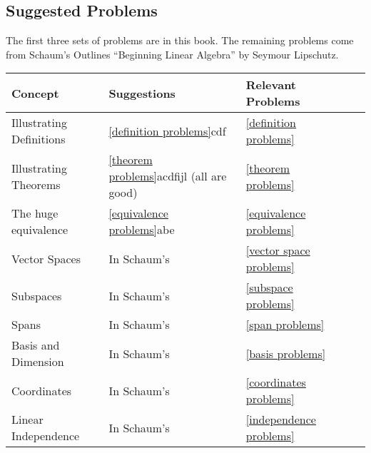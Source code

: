 \subsection{Suggested Problems}

The first three sets of problems are in this book.  The remaining problems come from Schaum's Outlines ``Beginning Linear Algebra'' by Seymour Lipschutz.  
\begin{center}
\begin{tabular}{|l|l|l|l|l|}
\hline
Concept&Suggestions&Relevant Problems\\ \hline
Illustrating Definitions
	&\ref{definition problems}cdf
  &\ref{definition problems}
  \\ \hline
Illustrating Theorems
	& \ref{theorem problems}acdfijl (all are good)  
	&\ref{theorem problems}
	\\ \hline
The huge equivalence
	&\ref{equivalence problems}abe 
	&\ref{equivalence problems}
	\\ \hline
Vector Spaces
	& In Schaum's
	&\ref{vector space problems}
	\\ \hline
Subspaces
	& In Schaum's
	&\ref{subspace problems}
	\\ \hline
Spans
	&In Schaum's
	&\ref{span problems}
	\\ \hline
Basis and Dimension
	&In Schaum's
	&\ref{basis problems}
	\\ \hline
Coordinates
	&In Schaum's
	&\ref{coordinates problems}
	\\ \hline
Linear Independence
	&In Schaum's
	&\ref{independence problems}
	\\ \hline
\end{tabular}
\end{center}

